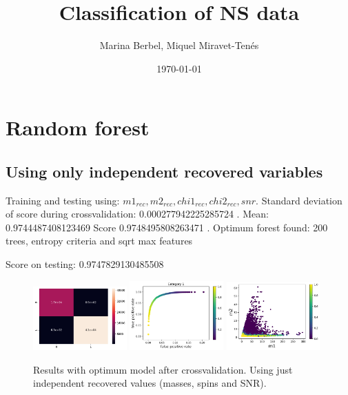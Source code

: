 \documentclass[prd,aps,twocolumn,a4paper,showkeys,nofootinbib]{revtex4-2}
\begin{document}
\title{Classification of NS data}

\author{Marina Berbel, Miquel Miravet-Tenés}

\date{\today}

\maketitle

\section{Random forest}


\subsection{Using only independent recovered variables}
Training and testing using: $m1_{rec}, m2_{rec}, chi1_{rec}, chi2_{rec}, snr$.
Standard deviation of score during crossvalidation:  0.000277942225285724 . Mean:  0.9744487408123469
Score  0.9748495808263471 . Optimum forest found:  200  trees,  entropy  criteria and  sqrt  max features

Score on testing:  0.9747829130485508

\begin{figure}[]
\includegraphics[width=0.32\textwidth]{./FigNSclass/CM_indRecCross}
\includegraphics[width=0.32\textwidth]{./FigNSclass/rocCurve_indRecCross}
\includegraphics[width=0.32\textwidth]{./FigNSclass/scatterplot_indRecCross}
\caption{\label{fig:indreccross} Results with optimum model after crossvalidation. Using just independent recovered values (masses, spins and SNR).}
\end{figure}
\end{document}
